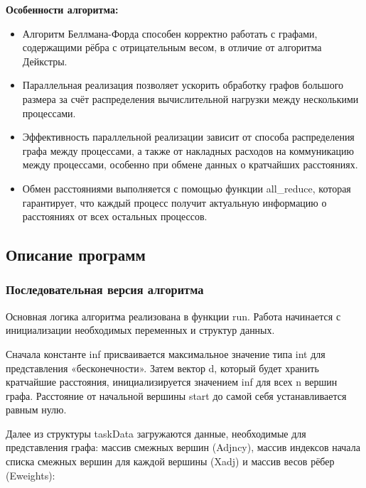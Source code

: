 \documentclass[a4paper, 14pt]{article}
\begin{document}
\textbf{Особенности алгоритма:}
\vspace{-1em}
\begin{itemize}
    \item  Алгоритм Беллмана-Форда способен корректно работать с графами, содержащими рёбра с отрицательным весом, в отличие от алгоритма Дейкстры.
    \item Параллельная реализация позволяет ускорить обработку графов большого размера за счёт распределения вычислительной нагрузки между несколькими процессами.
    \item Эффективность параллельной реализации зависит от способа распределения графа между процессами, а также от накладных расходов на коммуникацию между процессами, особенно при обмене данных о кратчайших расстояниях.
    \item Обмен расстояниями выполняется с помощью функции all\_reduce, которая гарантирует, что каждый процесс получит актуальную информацию о расстояниях от всех остальных процессов.
\end{itemize}
	\newpage
	\subsection*{\centering Описание программ}
	\subsubsection*{\centering Последовательная версия алгоритма}
    Основная логика алгоритма реализована в функции run. Работа начинается с инициализации необходимых переменных и структур данных.

Сначала константе inf присваивается максимальное значение типа int для представления «бесконечности». Затем вектор d, который будет хранить кратчайшие расстояния, инициализируется значением inf для всех n вершин графа. Расстояние от начальной вершины start до самой себя устанавливается равным нулю.

Далее из структуры taskData загружаются данные, необходимые для представления графа: массив смежных вершин (Adjncy), массив индексов начала списка смежных вершин для каждой вершины (Xadj) и массив весов рёбер (Eweights):
\end{document}

